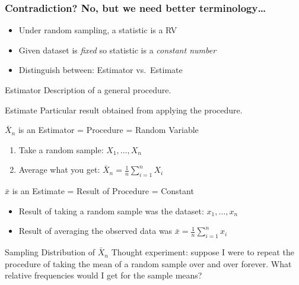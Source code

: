 \documentclass{beamer}
\begin{document}
\begin{frame}
  \frametitle{Contradiction? No, but we need better terminology\dots}
  \begin{itemize}
    \item Under random sampling, a statistic is a RV
    \item Given dataset is \emph{fixed} so statistic is a \emph{constant number}
    \item Distinguish between: \alert{Estimator} vs.\ \alert{Estimate}
  \end{itemize}

  \begin{alertblock}{Estimator}
   Description of a general procedure. 
  \end{alertblock}
  \begin{alertblock}{Estimate}
    Particular result obtained from applying the procedure.
  \end{alertblock}
\end{frame}
\begin{frame}
  \begin{block}{$\bar{X}_n$ is an Estimator = Procedure = Random Variable}
\begin{enumerate}
\item Take a random sample: $X_1, \hdots, X_n \quad$ 
\item Average what you get: $\bar{X}_n = \frac{1}{n}\sum_{i=1}^n X_i\quad$ 
\end{enumerate}
\end{block}

\pause
\begin{block}{$\bar{x}$ is an Estimate = Result of Procedure = Constant}
 \begin{itemize}
\item Result of taking a random sample was the dataset: $x_1, \hdots, x_n$ 
\item Result of averaging the observed data was $\bar{x} = \frac{1}{n}\sum_{i=1}^n x_i$ 
\end{itemize}
\end{block}

\pause
\begin{block}{Sampling Distribution of $\bar{X}_n$}
  \alert{Thought experiment:} suppose I were to repeat the procedure of taking the mean of a random sample over and over \alert{forever}. What \alert{relative frequencies} would I get for the sample means?
\end{block}

\end{frame}
\end{document}
